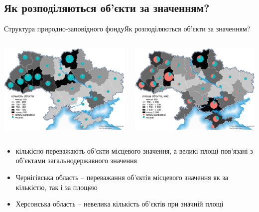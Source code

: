 \documentclass[12pt, aspectratio=1610]{beamer}
\begin{document}
\subsection{Як розподіляються об'єкти за значенням?}
\begin{frame}{Структура природно-заповідного фонду}{Як розподіляються об'єкти за значенням?}
	\begin{columns}[c]
		
		
		\includegraphics[width=\textwidth]{./figures/objects_count.png}%
		
		
		\includegraphics[width=\textwidth]{./figures/objects_area.png}
		
	\end{columns}
\begin{itemize}
	\item кількісно переважають об'єкти місцевого значення, а великі площі пов'язані з об'єктами загальнодержавного значення
	\item Чернігівська область -- переважання об'єктів місцевого значення як за кількістю, так і за площею
	\item Херсонська область -- невелика кількість об'єктів при значній площі
\end{itemize}
\end{frame}
\end{document}
